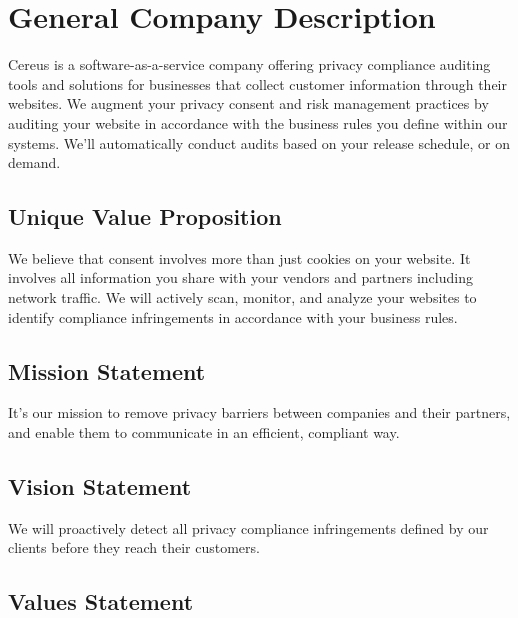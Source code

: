 {\let\cleardoublepage\relax \chapter*{General Company Description}}

Cereus is a software-as-a-service company offering privacy compliance auditing tools and solutions for businesses that collect customer information through their websites. We augment your privacy consent and risk management practices by auditing your website in accordance with the business rules you define within our systems. We'll automatically conduct audits based on your release schedule, or on demand.

{\let\clearpage\relax \section{Unique Value Proposition}}

We believe that consent involves more than just cookies on your website. It involves all information you share with your vendors and partners including network traffic. We will actively scan, monitor, and analyze your websites to identify compliance infringements in accordance with your business rules.

{\let\clearpage\relax \section{Mission Statement}}

It's our mission to remove privacy barriers between companies and their partners, and enable them to communicate in an efficient, compliant way.


\section{Vision Statement}

We will proactively detect all privacy compliance infringements defined by our clients before they reach their customers.

\section{Values Statement}

